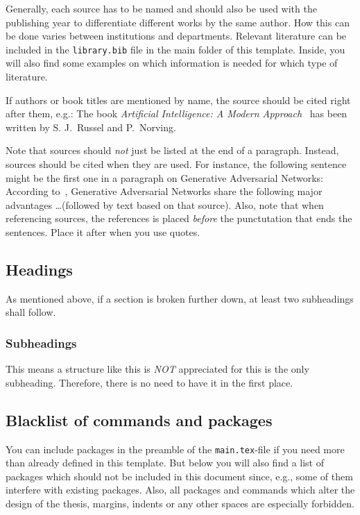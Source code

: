 \documentclass[
    language=german, %
    thesis=bachelor, %
    supervisor=postdoc, %
    multiauthor=false, %
    ]{settings/csssa-thesis}
\begin{document}
Generally, each source has to be named and should also be used with the publishing year to differentiate different works by the same author. How this can be done varies between institutions and departments. Relevant literature can be included in the \texttt{library.bib} file in the main folder of this template. Inside, you will also find some examples on which information is needed for which type of literature.

If authors or book titles are mentioned by name, the source should be cited right after them, e.g.: The book \emph{Artificial Intelligence: A Modern Approach}~\citep{Rusell2003artificial} has been written by S. J.\ Russel and P.\ Norving.

Note that sources should \emph{not} just be listed at the end of a paragraph.  Instead, sources should be cited when they are used. For instance, the following sentence might be the first one in a paragraph on Generative Adversarial Networks: According to~\textcite{Goodfellow2014gan}, Generative Adversarial Networks share the following major advantages \ldots (followed by text based on that source). Also, note that when referencing sources, the references is placed \textit{before} the punctutation that ends the sentences. Place it after when you use quotes. 

\subsection{Headings}
As mentioned above, if a section is broken further down, at least two subheadings shall follow.

\subsubsection{Subheadings}
This means a structure like this is \emph{NOT} appreciated for this is the only subheading. Therefore, there is no need to have it in the first place.

\subsection[Blacklist]{Blacklist of commands and packages}
You can include packages in the preamble of the \texttt{main.tex}-file if you need more than already defined in this template. But below you will also find a list of packages which should not be included in this document since, e.g., some of them interfere with existing packages. Also, all packages and commands which alter the design of the thesis, margins, indents or any other spaces are especially forbidden.
\end{document}
